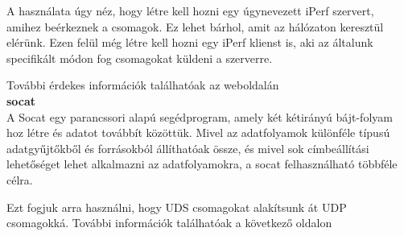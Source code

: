 \documentclass[a4paper,oneside]{article}
\begin{document}
A használata úgy néz, hogy létre kell hozni egy úgynevezett iPerf szervert, 
amihez beérkeznek a csomagok. Ez lehet bárhol, amit az hálózaton keresztül elérünk. 
Ezen felül még létre kell hozni egy iPerf klienst is, aki az általunk 
specifikált módon fog csomagokat küldeni a szerverre.

További érdekes információk találhatóak az weboldalán ~\cite{iperf} \\

\textbf{socat} \\
A Socat egy parancssori alapú segédprogram, amely két kétirányú bájt-folyam 
hoz létre és adatot továbbít közöttük. Mivel az adatfolyamok különféle típusú 
adatgyűjtőkből és forrásokból állíthatóak össze, és mivel sok címbeállítási 
lehetőséget lehet alkalmazni az adatfolyamokra, a socat felhasználható 
többféle célra.

Ezt fogjuk arra használni, hogy UDS csomagokat alakítsunk át UDP csomagokká. 
További információk találhatóak a következő oldalon ~\cite{socat}


\end{document}
